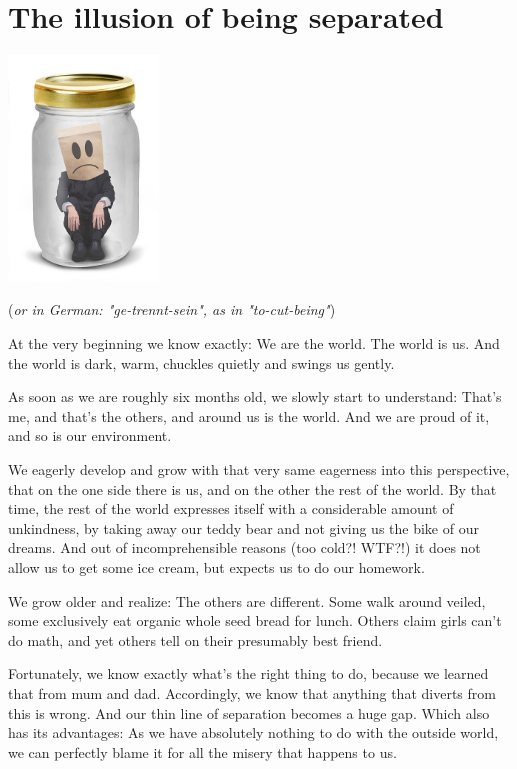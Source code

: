 \section{The illusion of being separated}

\begin{center}
\includegraphics[width=4cm]{images/18_separated.png}
\end{center}

(\textit{or in German: "ge-trennt-sein", as in "to-cut-being"})

At the very beginning we know exactly: We are the world. The world is us. And the world is dark, warm, chuckles quietly and swings us gently.

As soon as we are roughly six months old, we slowly start to understand: That's me, and that's the others, and around us is the world. And we are proud of it, and so is our environment.

We eagerly develop and grow with that very same eagerness into this perspective, that on the one side there is us, and on the other the rest of the world. By that time, the rest of the world expresses itself with a considerable amount of unkindness, by taking away our teddy bear and not giving us the bike of our dreams. And out of incomprehensible reasons (too cold?! WTF?!) it does not allow us to get some ice cream, but expects us to do our homework.

We grow older and realize: The others are different. Some walk around veiled, some exclusively eat organic whole seed bread for lunch. Others claim girls can't do math, and yet others tell on their presumably best friend.

Fortunately, we know exactly what's the right thing to do, because we learned that from mum and dad. Accordingly, we know that anything that diverts from this is wrong. And our thin line of separation becomes a huge gap. Which also has its advantages: As we have absolutely nothing to do with the outside world, we can perfectly blame it for all the misery that happens to us.

